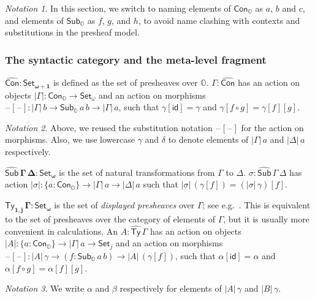 \documentclass[acmsmall]{acmart}
\newcommand{\msf}[1]{\mathsf{#1}}
\newcommand{\mbb}[1]{\mathbb{#1}}
\newcommand{\bs}[1]{\boldsymbol{#1}}
\newcommand{\wh}[1]{\widehat{#1}}
\newcommand{\mbbo}{\mbb{O}}
\newcommand{\Con}{\msf{Con}}
\newcommand{\Cono}{\msf{Con}_{\mbbo}}
\newcommand{\Subo}{\msf{Sub}_{\mbbo}}
\newcommand{\hSub}{\wh{\msf{Sub}}}
\newcommand{\hTy}{\wh{\msf{Ty}}}
\newcommand{\id}{\msf{id}}
\newcommand{\Set}{\mathsf{Set}}
\newcommand{\blank}{{\mathord{\hspace{1pt}\text{--}\hspace{1pt}}}}
\theoremstyle{remark}
\newtheorem{notation}{Notation}
\begin{document}
\begin{notation}
In this section, we switch to naming elements of $\Cono$ as $a$, $b$ and $c$,
and elements of $\Subo$ as $f$, $g$, and $h$, to avoid name clashing with
contexts and substitutions in the presheaf model.
\end{notation}

\subsubsection{The syntactic category and the meta-level fragment}

\begin{definition} $\bs{\wh{\Con} : \Set_{\omega+1}}$ is defined as the set of presheaves
over $\mbbo$. $\Gamma : \wh{\Con}$ has an action on objects $|\Gamma| :
\Cono \to \Set_\omega$ and an action on morphisms $\blank[\blank] : |\Gamma|\,b
\to \Subo\,a\,b \to |\Gamma|\,a$, such that $\gamma[\id] = \gamma$ and
$\gamma[f\circ g] = \gamma[f][g]$.

\begin{notation}
Above, we reused the substitution notation $\blank[\blank]$ for the action on
morphisms.  Also, we use lowercase $\gamma$ and $\delta$ to denote elements of
$|\Gamma|\,a$ and $|\Delta|\,a$ respectively.
\end{notation}

\end{definition}
\begin{definition} $\bs{\hSub\,\Gamma\,\Delta : \Set_\omega}$ is the set of natural transformations
from $\Gamma$ to $\Delta$. $\sigma : \hSub\,\Gamma\,\Delta$ has action
$|\sigma| : \{a : \Cono\} \to |\Gamma|\,a \to |\Delta|\,a$ such that
$|\sigma|\,(\gamma[f]) = (|\sigma|\,\gamma)[f]$.
\end{definition}

\begin{definition}
$\bs{\hTy_{1,j}\,\Gamma : \Set_\omega}$ is the set of \emph{displayed presheaves}
over $\Gamma$; see e.g.\ \cite{TODO}. This is equivalent to the set of
presheaves over the category of elements of $\Gamma$, but it is usually more
convenient in calculations. An $A : \hTy\,\Gamma$ has an action on objects
$|A| : \{a : \Cono\} \to |\Gamma|\,a \to \Set_j$ and an action on
morphisms $\blank[\blank] : |A|\,\gamma \to (f : \Subo\,a\,b) \to
|A|\,(\gamma[f])$, such that $\alpha[\id] = \alpha$ and $\alpha[f \circ g] = \alpha[f][g]$.

\begin{notation}
  We write $\alpha$ and $\beta$ respectively for elements of $|A|\,\gamma$ and
  $|B|\,\gamma$.
\end{notation}
\end{definition}
\end{document}
